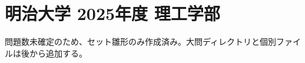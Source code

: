\documentclass[../../uem_mei_q.tex]{subfiles}
\begin{document}
    \section{明治大学 2025年度 理工学部}

    問題数未確定のため、セット雛形のみ作成済み。大問ディレクトリと個別ファイルは後から追加する。
\end{document}
